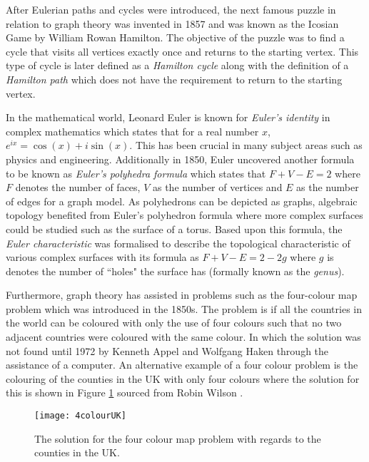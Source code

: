 After Eulerian paths and cycles \cite {victor2010eulerian} were introduced, the next famous puzzle in relation to graph theory was invented in 1857 and was known as the Icosian Game \cite{carlson_2022} by William Rowan Hamilton. The objective of the puzzle was to find a cycle that visits all vertices exactly once and returns to the starting vertex. This type of cycle is later defined as a \emph{Hamilton cycle} \cite{rahman2005hamiltonian} along with the definition of a \emph{Hamilton path} which does not have the requirement to return to the starting vertex.

In the mathematical world, Leonard Euler is known for \emph{Euler's identity} in complex mathematics which states that for a real number $x$, $e^{ix}=\cos(x)+i\sin(x)$. This has been crucial in many subject areas such as physics and engineering. Additionally in 1850, Euler uncovered another formula to be known as \emph{Euler's polyhedra formula} which states that $F + V - E = 2$ where $F$ denotes the number of faces, $V$ as the number of vertices and $E$ as the number of edges for a graph model. As polyhedrons can be depicted as graphs, algebraic topology benefited from Euler's polyhedron formula where more complex surfaces could be studied such as the surface of a torus. Based upon this formula, the \emph{Euler characteristic} was formalised to describe the topological characteristic of various complex surfaces with its formula as $F + V - E = 2 - 2g$ where $g$ is denotes the number of ``holes" the surface has (formally known as the \emph{genus}). 

Furthermore, graph theory has assisted in problems such as the four-colour map problem which was introduced in the 1850s. The problem is if all the countries in the world can be coloured with only the use of four colours such that no two adjacent countries were coloured with the same colour. In which the solution was not found until 1972 by Kenneth Appel and Wolfgang Haken \cite{Ohnishi2009} through the assistance of a computer. An alternative example of a four colour problem is the colouring of the counties in the UK with only four colours where the solution for this is shown in Figure \ref{fig:UK 4 colour} sourced from Robin Wilson \cite{4ColourRobin}.

\begin{figure}[!htb]
\centering
\texttt{[image: 4colourUK]}
\caption{The solution for the four colour map problem with regards to the counties in the UK.}
\label{fig:UK 4 colour}
\end{figure}

